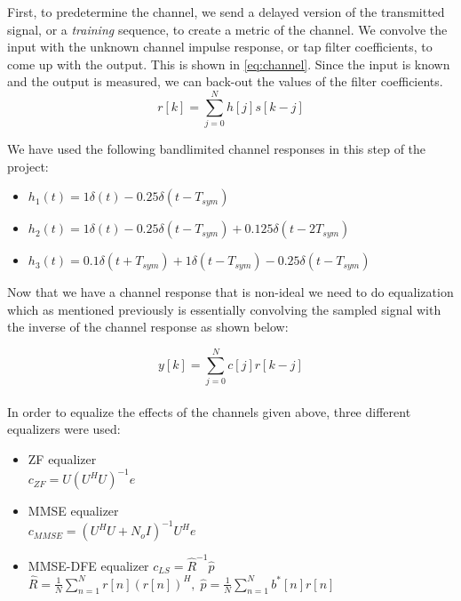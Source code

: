 \documentclass[]{article}
\begin{document}
First, to predetermine the channel, we send a delayed version of the transmitted signal, or a \emph{training} sequence, to create a metric of the channel.  We convolve the input with the unknown channel impulse response, or tap filter coefficients, to come up with the output.  This is shown in \ref{eq:channel}.  Since the input is known and the output is measured, we can back-out the values of the filter coefficients.  \\

\begin{equation}
\label{eq:channel}
r\left[k\right] = \sum_{j=0}^N h[j]s\left[k-j\right]
\end{equation}

We have used the following bandlimited channel responses in this step of the project:

\begin{itemize}
\item $h_1(t) = 1\delta(t) - 0.25\delta(t - T_{sym})  $
\item $h_2(t) = 1\delta(t) - 0.25\delta(t - T_{sym})   + 0.125\delta(t - 2T_{sym}) $
\item $h_3(t) = 0.1\delta(t + T_{sym}) +1\delta(t - T_{sym}) - 0.25\delta(t - T_{sym})   $
\end{itemize} 

Now that we have a channel response that is non-ideal we need to do equalization which as mentioned previously is essentially convolving the sampled signal with the inverse of the channel response as shown below: 

\begin{equation}
\label{eq:channel}
y\left[k\right] = \sum_{j=0}^N c[j]r\left[k-j\right]
\end{equation}
\\
In order to equalize the effects of the channels given above, three different equalizers were used: 

\begin{itemize}
\item ZF equalizer \\
$c_{ZF} = U(U^HU)^{-1}e$ \\
\item MMSE equalizer \\
$c_{MMSE} = (U^HU + N_oI)^{-1}U^He$ \\
\item MMSE-DFE equalizer
$c_{LS} = \hat{R}^{-1}\hat{p} $ \\
$ \hat{R} = \frac{1}{N} \sum_{n=1}^N r[n](r[n])^H, \; \hat{p} = \frac{1}{N}\sum_{n=1}^N b^*[n]r[n]$ \\


\end{itemize}
\end{document}
